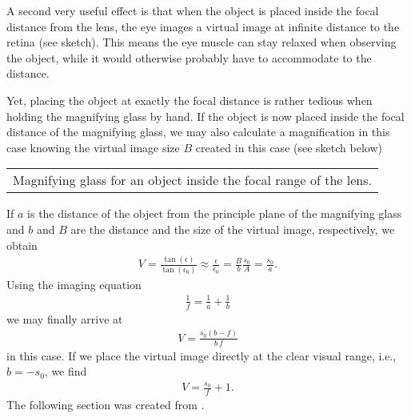 \documentclass[letterpaper,10pt,english]{sphinxmanual}
\begin{document}
A second very useful effect is that when the object is placed inside the focal distance from the lens, the eye images a virtual image at infinite distance to the retina (see sketch). This means the eye muscle can stay relaxed when observing the object, while it would otherwise probably have to accommodate to the distance.

Yet, placing the object at exactly the focal distance is rather tedious when holding the magnifying glass by hand. If the object is now placed inside the focal distance of the magnifying glass, we may also calculate a magnification in this case knowing the virtual image size \(B\) created in this case (see sketch below)


\begin{savenotes}\sphinxattablestart
\centering
\begin{tabulary}{\linewidth}[t]{|T|}
\hline
\sphinxstyletheadfamily 
{}
\\
\hline
{} Magnifying glass for an object inside the focal range of the lens.
\\
\hline
\end{tabulary}
\par
\sphinxattableend\end{savenotes}

If \(a\) is the distance of the object from the principle plane of the magnifying glass and \(b\) and \(B\) are the distance and the size of the virtual image, respectively, we obtain
\begin{equation*}
\begin{split}V=\frac{\tan(\epsilon)}{\tan(\epsilon_0)}\approx \frac{\epsilon}{\epsilon_0}=\frac{B}{b}\frac{s_0}{A}=\frac{s_0}{a}.\end{split}
\end{equation*}
Using the imaging equation
\begin{equation*}
\begin{split}\frac{1}{f}=\frac{1}{a}+\frac{1}{b}\end{split}
\end{equation*}
we may finally arrive at
\begin{equation*}
\begin{split}V=\frac{s_0(b-f)}{b\,f}\end{split}
\end{equation*}
in this case. If we place the virtual image directly at the clear visual range, i.e., \(b=-s_0\), we find
\begin{equation*}
\begin{split}V=\frac{s_0}{f}+1.\end{split}
\end{equation*}
The following section was created from .
\end{document}
